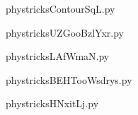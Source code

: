     

    \clearpage
    


    \newcommand{\CaptionFigContourSqL}{<+Type your caption here+>}
    \begin{center}
        
    \end{center}
    phystricksContourSqL.py

    

    \clearpage
    


    \newcommand{\CaptionFigUZGooBzlYxr}{<+Type your caption here+>}
    \begin{center}
        
    \end{center}
    phystricksUZGooBzlYxr.py

    

    \clearpage
    


    \newcommand{\CaptionFigLAfWmaN}{<+Type your caption here+>}
    \begin{center}
        
    \end{center}
    phystricksLAfWmaN.py

    

    \clearpage
    


    \newcommand{\CaptionFigBEHTooWsdrys}{<+Type your caption here+>}
    \begin{center}
        
    \end{center}
    phystricksBEHTooWsdrys.py

    

    \clearpage
    


    \newcommand{\CaptionFigHNxitLj}{<+Type your caption here+>}
    \begin{center}
        
    \end{center}
    phystricksHNxitLj.py

    

    \clearpage
    


